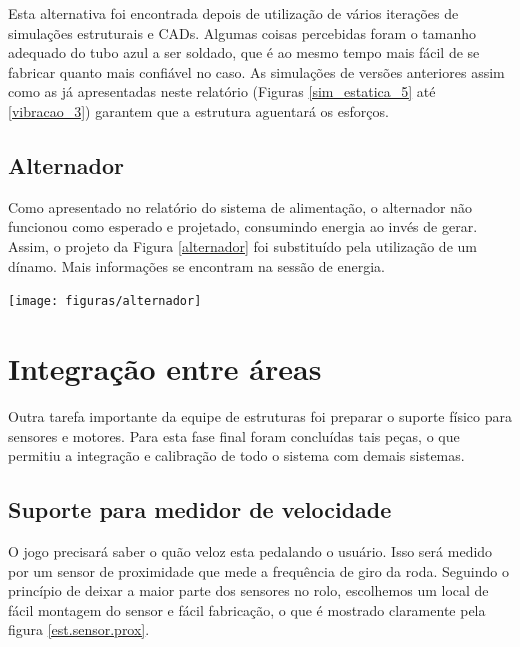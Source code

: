 
    Esta alternativa foi encontrada depois de utilização de vários iterações de simulações estruturais e CADs. Algumas coisas percebidas foram o tamanho adequado do tubo azul a ser soldado, que é ao mesmo tempo mais fácil de se fabricar quanto mais confiável no caso. As simulações de versões anteriores assim como as já apresentadas neste relatório (Figuras \ref{sim_estatica_5} até \ref{vibracao_3}) garantem que a estrutura aguentará os esforços.

\subsection{Alternador}

    Como apresentado no relatório do sistema de alimentação, o alternador não funcionou como esperado e projetado, consumindo energia ao invés de gerar. Assim, o projeto da Figura \ref{alternador} foi substituído pela utilização de um dínamo. Mais informações se encontram na sessão de energia.

    \begin{center}
    	\texttt{[image: figuras/alternador]}
        \label{alternador}
    \end{center}

  \section{Integração entre áreas} \label{secao.integracao}

	Outra tarefa importante da equipe de estruturas foi preparar o suporte físico para sensores e motores. Para esta fase final foram concluídas tais peças, o que permitiu a integração e calibração de todo o sistema com demais sistemas.

  \subsection{Suporte para medidor de velocidade}

  O jogo precisará saber o quão veloz esta pedalando o usuário. Isso será medido por um sensor de proximidade que mede a frequência de giro da roda. Seguindo o princípio de deixar a maior parte dos sensores no rolo, escolhemos um local de fácil montagem do sensor e fácil fabricação, o que é mostrado claramente pela figura \ref{est.sensor.prox}.

